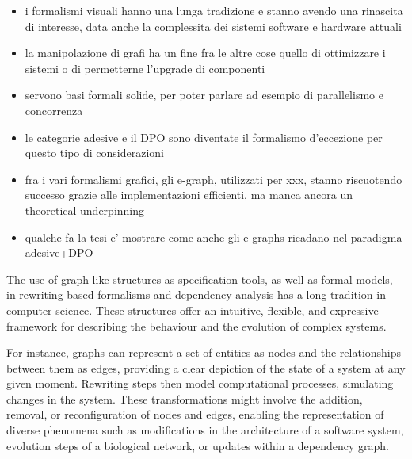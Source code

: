 \begin{itemize}
\item i formalismi visuali hanno una lunga tradizione e stanno avendo una rinascita di interesse, data anche la complessita dei sistemi software e hardware attuali
\item la manipolazione di grafi ha un fine fra le altre cose quello di ottimizzare i sistemi o di permetterne l'upgrade di componenti
\item servono basi formali solide, per poter parlare ad esempio di parallelismo e concorrenza
\item le categorie adesive e il DPO sono diventate il formalismo d'eccezione per questo tipo di considerazioni
\item fra i vari formalismi grafici, gli e-graph, utilizzati per xxx, stanno riscuotendo successo grazie alle implementazioni efficienti, ma manca ancora un theoretical underpinning
\item qualche fa la tesi e' mostrare come anche gli e-graphs ricadano nel paradigma adesive+DPO
\end{itemize}

\fi

The use of graph-like structures as specification tools, as well as formal models, in rewriting-based formalisms and dependency analysis has a long tradition in computer science.
These structures offer an intuitive, flexible, and expressive framework for describing the behaviour and the evolution of complex systems.

For instance, graphs can represent a set of entities as nodes and the relationships between them as edges, providing a clear depiction of the state of a system at any given moment. Rewriting steps then model computational processes, simulating changes in the system. These transformations might involve the addition, removal, or reconfiguration of nodes and edges, enabling the representation of diverse phenomena such as modifications in the architecture of a software system, evolution steps of a biological network, or updates within a dependency graph. 


